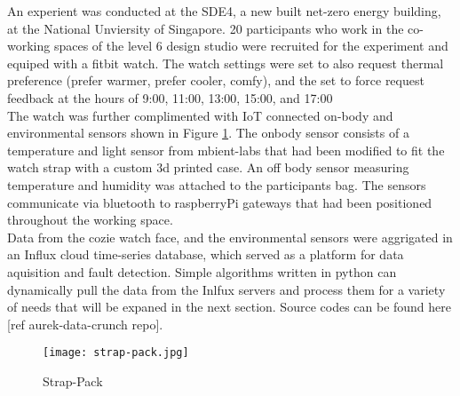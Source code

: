 
An experient was conducted at the SDE4, a new built net-zero energy building, at the National Unviersity of Singapore. 20 participants who work in the co-working spaces of the level 6 design studio were recruited for the experiment and equiped with a fitbit watch. The watch settings were set to also request thermal preference (prefer warmer, prefer cooler, comfy), and the set to force request feedback at the hours of 9:00, 11:00, 13:00, 15:00, and 17:00 \\

The watch was further complimented with IoT connected on-body and environmental sensors shown in Figure \ref{fig:strappack}. The onbody sensor consists of a temperature and light sensor from mbient-labs that had been modified to fit the watch strap with a custom 3d printed case. An off body sensor measuring temperature and humidity was attached to the participants bag. The sensors communicate via bluetooth to raspberryPi gateways that had been positioned throughout the working space. \\

Data from the cozie watch face, and the environmental sensors were aggrigated in an Influx cloud time-series database, which served as a platform for data aquisition and fault detection. Simple algorithms written in python can dynamically pull the data from the Inlfux servers and process them for a variety of needs that will be expaned in the next section. Source codes can be found here [ref aurek-data-crunch repo].


\begin{figure}
\begin{center}
\texttt{[image: strap-pack.jpg]}
\caption{Strap-Pack}
\label{fig:strappack}
\end{center}
\end{figure}

